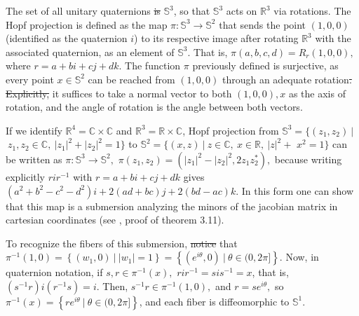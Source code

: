 \documentclass[12pt, letterpaper, reqno]{amsart}
\theoremstyle{definition}
\theoremstyle{plain}
\theoremstyle{remark}
\providecommand{\DIFadd}[1]{{\protect\color{blue}\uwave{#1}}} %
\providecommand{\DIFdel}[1]{{\protect\color{red}\sout{#1}}}                      %
\providecommand{\DIFaddbegin}{} %
\providecommand{\DIFaddend}{} %
\providecommand{\DIFdelbegin}{} %
\providecommand{\DIFdelend}{} %
\newcommand{\DIFscaledelfig}{0.5}
\newlength{\DIFdelgraphicswidth} %
\newlength{\DIFdelgraphicsheight} %
\newcommand{\DIFaddincludegraphics}[2][]{{\color{blue}\fbox{\DIFOincludegraphics[#1]{#2}}}} %
\newcommand{\DIFdelincludegraphics}[2][]{%
\sbox{\DIFdelgraphicsbox}{\DIFOincludegraphics[#1]{#2}}%
\settoboxwidth{\DIFdelgraphicswidth}{\DIFdelgraphicsbox} %
\settoboxtotalheight{\DIFdelgraphicsheight}{\DIFdelgraphicsbox} %
\scalebox{\DIFscaledelfig}{%
\parbox[b]{\DIFdelgraphicswidth}{\usebox{\DIFdelgraphicsbox}\\[-\baselineskip] \rule{\DIFdelgraphicswidth}{0em}}\llap{\resizebox{\DIFdelgraphicswidth}{\DIFdelgraphicsheight}{%
\setlength{\unitlength}{\DIFdelgraphicswidth}%
\begin{picture}(1,1)%
\thicklines\linethickness{2pt} %
{\color[rgb]{1,0,0}\put(0,0){\framebox(1,1){}}}%
{\color[rgb]{1,0,0}\put(0,0){\line( 1,1){1}}}%
{\color[rgb]{1,0,0}\put(0,1){\line(1,-1){1}}}%
\end{picture}%
}\hspace*{3pt}}} %
} %
\DeclareRobustCommand{\DIFaddbegin}{\DIFOaddbegin \let\includegraphics\DIFaddincludegraphics} %
\DeclareRobustCommand{\DIFaddend}{\DIFOaddend \let\includegraphics\DIFOincludegraphics} %
\DeclareRobustCommand{\DIFdelbegin}{\DIFOdelbegin \let\includegraphics\DIFdelincludegraphics} %
\DeclareRobustCommand{\DIFdelend}{\DIFOaddend \let\includegraphics\DIFOincludegraphics} %
\begin{document}
The set of all unitary quaternions \DIFdelbegin \DIFdel{is }\DIFdelend \DIFaddbegin \DIFadd{can be identified with }\DIFaddend $ \mathbb{S}^3 $, so that $ \mathbb{S}^3 $ acts on $ \mathbb{R}^3 $ via rotations. The Hopf projection is defined as the map $ \pi: \mathbb{S}^3 \rightarrow \mathbb{S}^2 $ that sends the point $ (1,0,0) $ (identified as the quaternion $ i $)   to its respective image after rotating $ \mathbb{R}^3 $ with the associated quaternion, as an element of $ \mathbb{S}^3 $. That is, $ \pi(a,b,c,d) = R_r(1,0,0), $ where $ r=a+bi+cj+dk. $  The function $ \pi $ previously defined is surjective, as every point $ x\in\mathbb{S}^2 $ can be reached from $ (1,0,0) $ through an adequate rotation\DIFdelbegin \DIFdel{. Explicitly, }\DIFdelend \DIFaddbegin \DIFadd{: }\DIFaddend it suffices to take a normal vector to both $ (1,0,0), x $ as the axis of rotation, and the angle of rotation is the angle between both vectors. 

	If we identify $ \mathbb{R}^4=\mathbb{C}\times \mathbb{C} $ and $ \mathbb{R}^3= \mathbb{R}\times\mathbb{C}  $, Hopf projection from $ \mathbb{S}^3= \{ (z_1,z_2)\  |$ $ \ z_1,z_2\in \mathbb{C}, \ |z_1|^2+|z_2|^2=1 \} $ to $ \mathbb{S}^2 = \{ (x,z)\ | \ z\in \mathbb{C},\ x\in \mathbb{R},\ |z|^2+$ $x^2=1 \} $  can be written as $ \pi: \mathbb{S}^3 \rightarrow { \mathbb{S}^2},$ $ \pi(z_1,z_2) =(|z_1|^2-|z_2|^2, 2z_1z_2^* ),$ because writing explicitly $ rir^{-1} $ with $ r=a+bi+cj+dk $ gives $ (a^2+b^2-c^2-d^2)i+2(ad+bc)j+2(bd-ac)k. $    In this form one can show that this map is a submersion analyzing the minors of the jacobian matrix in cartesian coordinates (see \cite{linintroductory}, proof of theorem 3.11).

	To recognize the fibers of this submersion, \DIFdelbegin \DIFdel{notice }\DIFdelend \DIFaddbegin \DIFadd{note }\DIFaddend that $ \pi^{-1}(1,0) = \left\{ (w_1,0) \ | \ |w_1| =1 \right\} = \left\{ (e^{i\theta},0) \ | \ \theta\in (0,2\pi]  \right\} $. Now, in quaternion notation, if $ s,r\in \pi^{-1}(x), $ $ rir^{-1} = sis^{-1}=x $, that is, $ (s^{-1}r)i(r^{-1}s) = i $. Then, $ s^{-1}r \in \pi^{-1}(1,0), $ and $ r= se^{i\theta}, $ so $ \pi^{-1}(x) = \left\{ re^{i\theta}\ | \ \theta\in (0,2\pi] \right\} $, and each fiber is diffeomorphic to $ \mathbb{S}^1. $        
\end{document}
